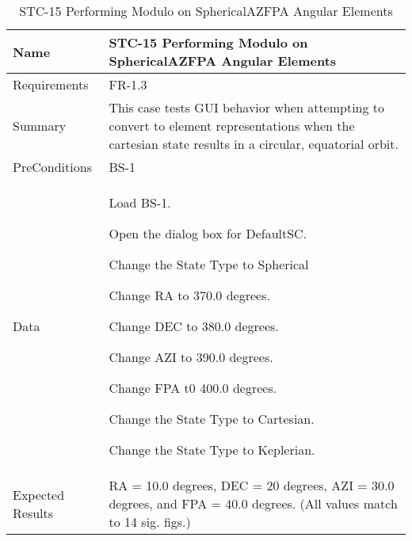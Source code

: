 
\begin{table}[htbp!]
\centering
      \begin{tabular}{|p{1.05 in} |p{4.75 in} |}
      \hline
         \rowcolor[rgb]{0.8,0.8,0.8} Name & STC-15 Performing Modulo on SphericalAZFPA Angular Elements\\
         \hline
         Requirements & FR-1.3\\  \hline
         Summary &
         This  case tests GUI behavior when attempting to convert to element representations when the
         cartesian state results in a circular, equatorial orbit.
         \\     \hline
         PreConditions & BS-1\\     \hline
         Data &
         \begin{compactenum}
             \item Load BS-1.
             \item Open the dialog box for DefaultSC.
             \item Change the State Type to Spherical
             \item Change RA to 370.0 degrees.
             \item Change DEC to 380.0 degrees.
             \item Change AZI to 390.0 degrees.
             \item Change FPA t0 400.0 degrees.
             \item Change the State Type to Cartesian.
             \item Change the State Type to Keplerian.
         \end{compactenum}
         \\ \hline
         Expected Results & RA = 10.0 degrees, DEC = 20 degrees, AZI = 30.0 degrees, and FPA = 40.0 degrees. (All
         values match to 14 sig. figs.)\\
      \hline
      \end{tabular}
      \label{Table:STC-15}
      \caption{STC-15 Performing Modulo on SphericalAZFPA Angular Elements}
\end{table} 